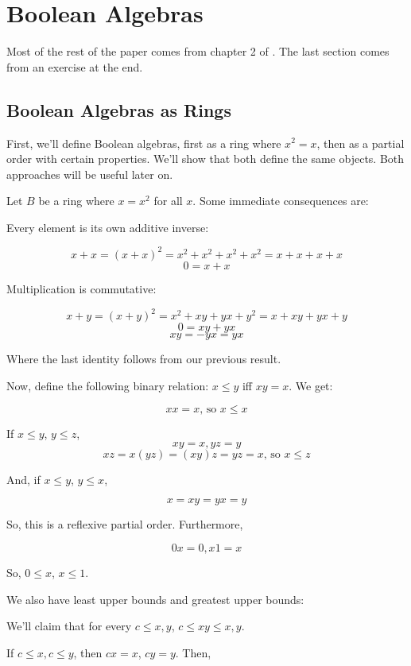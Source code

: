 \documentclass{article}
\begin{document}
  \section{Boolean Algebras}

    Most of the rest of the paper comes from chapter 2 of \cite{bool}. The last
    section comes from an exercise at the end.

    \subsection{Boolean Algebras as Rings}

      First, we'll define Boolean algebras, first as a ring where $x^2=x$, then as
      a partial order with certain properties. We'll show that both define the
      same objects. Both approaches will be useful later on.

      Let $B$ be a ring where $x = x^2$ for all $x$. Some immediate consequences
      are:

      Every element is its own additive inverse:

      \[ x + x = (x + x)^2 = x^2 + x^2 + x^2 + x^2 = x + x + x + x\] \[0 = x + x\]

      Multiplication is commutative:

      \[ x + y = (x + y)^2 = x^2 + xy + yx + y^2 = x + xy + yx + y\] \[0 = xy +
      yx\] \[xy = -yx = yx\]

      Where the last identity follows from our previous result.

      Now, define the following binary relation: $x \leq y$ iff $xy = x$. We get:

      \[xx = x \text{, so } x \leq x\]

      If $x \leq y$, $y \leq z$, \[xy = x, yz = y\] \[xz = x(yz) = (xy)z = yz = x
      \text{, so } x \leq z\]

      And, if $x \leq y$, $y \leq x$,

      \[x = xy = yx = y\]

      So, this is a reflexive partial order. Furthermore,

      \[0x = 0, x1 = x\]

      So, $0 \leq x$, $x \leq 1$.

      We also have least upper bounds and greatest upper bounds:

      We'll claim that for every $c \leq x,y$, $c \leq xy \leq x,y$.

      If $c \leq x, c \leq y$, then $cx = x$, $cy = y$. Then,
\end{document}
